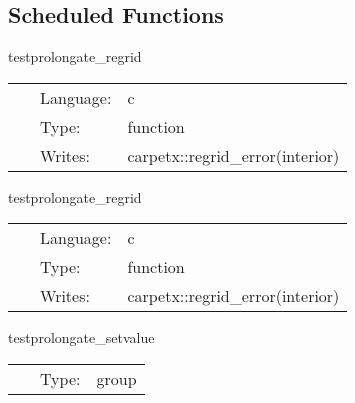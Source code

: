 \subsection*{Scheduled Functions}
\vspace{5mm}


\hspace{5mm} testprolongate\_regrid 

\hspace{5mm}{\it set up test grid } 


\hspace{5mm}

 \begin{tabular*}{160mm}{cll} 
~ & Language:  & c \\ 
~ & Type:  & function \\ 
~ & Writes:  & carpetx::regrid\_error(interior) \\ 
\end{tabular*} 


\vspace{5mm}


\hspace{5mm} testprolongate\_regrid 

\hspace{5mm}{\it set up test grid } 


\hspace{5mm}

 \begin{tabular*}{160mm}{cll} 
~ & Language:  & c \\ 
~ & Type:  & function \\ 
~ & Writes:  & carpetx::regrid\_error(interior) \\ 
\end{tabular*} 


\vspace{5mm}


\hspace{5mm} testprolongate\_setvalue 

\hspace{5mm}{\it set up test data } 


\hspace{5mm}

 \begin{tabular*}{160mm}{cll} 
~ & Type:  & group \\ 
\end{tabular*} 


